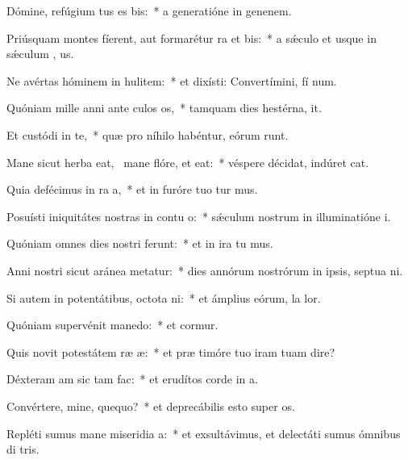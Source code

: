 \item Dómine, refúgium tus es bis:~* a generatióne in genenem.
\item Priúsquam montes fíerent, aut formarétur ra et bis:~* a sǽculo et usque in sǽculum  , us.
\item Ne avértas hóminem in hulitem:~* et dixísti: Convertímini, fí num.
\item Quóniam mille anni ante culos os,~* tamquam dies hestérna,  it.
\item Et custódi in te,~* quæ pro níhilo habéntur, eórum  runt.
\item Mane sicut herba eat,~\pscross{} mane flóre, et eat:~* véspere décidat, indúret  cat.
\item Quia defécimus in ra a,~* et in furóre tuo tur mus.
\item Posuísti iniquitátes nostras in contu o:~* sǽculum nostrum in illuminatióne  i.
\item Quóniam omnes dies nostri ferunt:~* et in ira tu mus.
\item Anni nostri sicut aránea metatur:~* dies annórum nostrórum in ipsis, septua ni.
\item Si autem in potentátibus, octota ni:~* et ámplius eórum, la  lor.
\item Quóniam supervénit manedo:~* et cormur.
\item Quis novit potestátem ræ æ:~* et præ timóre tuo iram tuam dire?
\item Déxteram am sic tam fac:~* et erudítos corde in a.
\item Convértere, mine, quequo?~* et deprecábilis esto super  os.
\item Repléti sumus mane miseridia a:~* et exsultávimus, et delectáti sumus ómnibus di tris.
